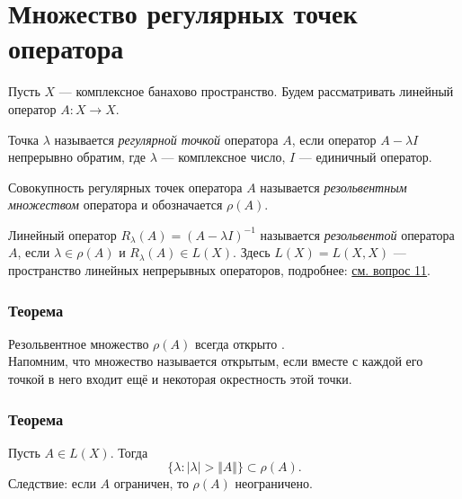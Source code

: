 \section{Множество регулярных точек оператора}
\label{sec:q-16}
Пусть $X$ --- комплексное банахово пространство. Будем рассматривать линейный оператор $A:X\rightarrow X$.

Точка $\lambda$ называется \textit{регулярной точкой} оператора $A$, если оператор $A - \lambda I$ непрерывно обратим, где $\lambda$ --- комплексное число, $I$ --- единичный оператор\cite[с.~247]{trenogin}.

Совокупность регулярных точек оператора $A$ называется \textit{резольвентным множеством} оператора и обозначается $\rho(A)$.

Линейный оператор $R_\lambda(A) = (A - \lambda I)^{-1}$ называется \textit{резольвентой} оператора $A$, если $\lambda \in \rho(A)$ и $R_\lambda(A) \in L(X)$. Здесь $L(X) = L(X, X)$ --- пространство линейных непрерывных операторов, подробнее:  \hyperref[sec:q-11]{см. вопрос 11}.

\subsubsection*{Теорема}
Резольвентное множество $\rho(A)$ всегда открыто \cite[с.~247]{trenogin}.\\
Напомним, что множество называется открытым, если вместе с каждой его точкой в него входит ещё и некоторая окрестность этой точки.

\subsubsection*{Теорема}
Пусть $A \in L(X)$. Тогда
$$\{\lambda : |\lambda| > \Vert A \Vert \} \subset \rho(A).$$
Следствие: если $A$ ограничен, то $\rho(A)$ неограничено\cite[с.~248]{trenogin}.